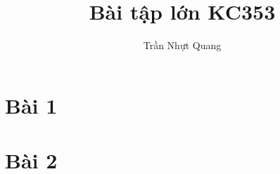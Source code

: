 \documentclass[a4paper,13pt,oneside]{report}
\title{Bài tập lớn KC353}%
\author{Trần Nhựt Quang}%
\begin{document}
	
	
	
	

	
	\tableofcontents%
	\listoffigures%
	\listoftables%
	\pagebreak
	
	

	\chapter{Bài 1}
	
	\pagebreak
	
	\chapter{Bài 2}
	
	
	
\end{document}
